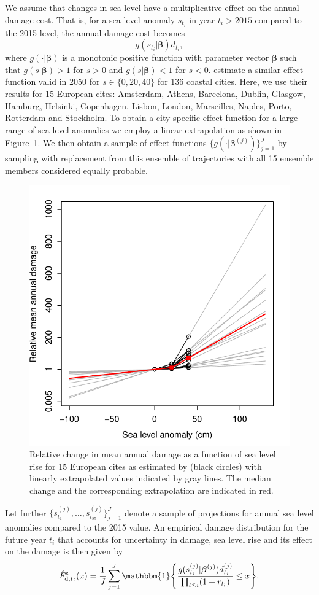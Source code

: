 \documentclass[note,screen,british,11pt]{nrdoc}
\begin{document}
We assume that changes in sea level have a multiplicative effect on the annual damage cost. That is, for a sea level anomaly $s_{t_i}$ in year $t_i > 2015$ compared to the 2015 level, the annual damage cost becomes
  \[
  g(s_{t_i} | \boldsymbol \beta ) d_{t_i},
  \]
where $g( \cdot | \boldsymbol \beta )$ is a monotonic positive function with parameter vector  $\boldsymbol \beta$ such that $g(s|\boldsymbol \beta ) > 1$ for $s>0$ and $g(s|\boldsymbol \beta ) < 1$ for $s < 0$. \cite{Hallegatte&2013} estimate a similar effect function valid in 2050 for $s \in \{0,20,40\}$ for 136 coastal cities. Here, we use their results for 15 European cites: Amsterdam, Athens, Barcelona, Dublin, Glasgow, Hamburg, Helsinki, Copenhagen, Lisbon, London, Marseilles, Naples, Porto, Rotterdam and Stockholm.  To obtain a city-specific effect function for a large range of sea level anomalies we employ a linear extrapolation as shown in Figure~\ref{fig:EffectFct}. We then obtain a sample of effect functions $\{g(\cdot|\boldsymbol \beta^{(j)})\}_{j=1}^J$ by sampling with replacement from this ensemble of trajectories with all 15 ensemble members considered equally probable. 

\begin{figure}[!hbpt]
\begin{center}
\includegraphics[width=0.5\linewidth]{DecisionAnalysisBergenPartII.pdf}
\caption{Relative change in mean annual damage as a function of sea level rise for 15 European cites as estimated by \cite{Hallegatte&2013} (black circles) with linearly extrapolated values indicated by gray lines. The median change and the corresponding extrapolation are indicated in red.}
\label{fig:EffectFct}
\end{center}
\end{figure}


Let further $\{s_{t_1}^{(j)}, \ldots, s_{t_{85}}^{(j)} \}_{j=1}^J$ denote a sample of projections for annual sea level anomalies compared to the 2015 value. An empirical damage distribution for the future year $t_i$ that accounts for uncertainty in damage, sea level rise and its effect on the damage is then given by
  \begin{equation}\label{eq:FutureDamage}
    \hat{F}_{\textup{d}, t_i}^\textup{s} (x) = \frac{1}{J} \sum_{j=1}^J \mathbbm{1}\Bigg\{ \frac{g(s_{t_i}^{(j)}| \boldsymbol \beta^{(j)}) d_{t_i}^{(j)}}{\prod_{l \leq i} (1 + r_{t_l})} \leq x \Bigg\}.
  \end{equation}
\end{document}
